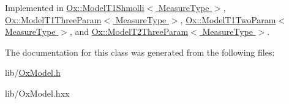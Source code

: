 Implemented in \hyperlink{class_ox_1_1_model_t1_shmolli_a846fb817183738d5c2b3f9f126c1597b}{Ox\-::\-Model\-T1\-Shmolli$<$ Measure\-Type $>$}, \hyperlink{class_ox_1_1_model_t1_three_param_afc6ffe41934c513e12a45cc5821fddca}{Ox\-::\-Model\-T1\-Three\-Param$<$ Measure\-Type $>$}, \hyperlink{class_ox_1_1_model_t1_two_param_aa090c6834141f00a966eebd6b0415e44}{Ox\-::\-Model\-T1\-Two\-Param$<$ Measure\-Type $>$}, and \hyperlink{class_ox_1_1_model_t2_three_param_a7a6d2bae4e394a99e9e8943af9f344d0}{Ox\-::\-Model\-T2\-Three\-Param$<$ Measure\-Type $>$}.



The documentation for this class was generated from the following files\-:\begin{DoxyCompactItemize}
\item 
lib/\hyperlink{_ox_model_8h}{Ox\-Model.\-h}\item 
lib/Ox\-Model.\-hxx\end{DoxyCompactItemize}
